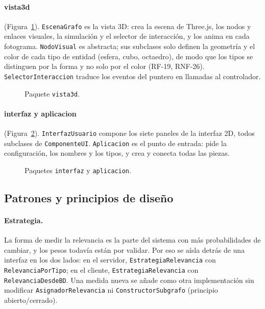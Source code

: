 \paragraph{vista3d} (Figura~\ref{fig:clases-vista3d}). \texttt{EscenaGrafo} es la vista 3D: crea la escena de Three.js, los nodos y enlaces visuales, la simulación y el selector de interacción, y los anima en cada fotograma. \texttt{NodoVisual} es abstracta; sus subclases solo definen la geometría y el color de cada tipo de entidad (esfera, cubo, octaedro), de modo que los tipos se distinguen por la forma y no solo por el color (RF-19, RNF-26). \texttt{SelectorInteraccion} traduce los eventos del puntero en llamadas al controlador.

\begin{figure}[htbp]
  \centering
  \caption{Paquete \texttt{vista3d}.}
  \label{fig:clases-vista3d}
\end{figure}

\paragraph{interfaz y aplicacion} (Figura~\ref{fig:clases-interfaz}). \texttt{InterfazUsuario} compone los siete paneles de la interfaz 2D, todos subclases de \texttt{ComponenteUI}. \texttt{Aplicacion} es el punto de entrada: pide la configuración, los nombres y los tipos, y crea y conecta todas las piezas.

\begin{figure}[htbp]
  \centering
  \caption{Paquetes \texttt{interfaz} y \texttt{aplicacion}.}
  \label{fig:clases-interfaz}
\end{figure}

\subsection{Patrones y principios de diseño}
\label{sec:patrones}

\paragraph{Estrategia.} La forma de medir la relevancia es la parte del sistema con más probabilidades de cambiar, y los pesos todavía están por validar. Por eso se aísla detrás de una interfaz en los dos lados: en el servidor, \texttt{EstrategiaRelevancia} con \texttt{RelevanciaPorTipo}; en el cliente, \texttt{EstrategiaRelevancia} con \texttt{RelevanciaDesdeBD}. Una medida nueva se añade como otra implementación sin modificar \texttt{AsignadorRelevancia} ni \texttt{ConstructorSubgrafo} (principio abierto/cerrado).


